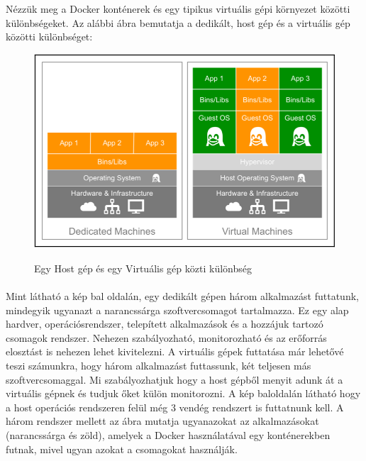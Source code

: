 \pagebreak

Nézzük meg a Docker konténerek és egy tipikus virtuális gépi környezet közötti különbségeket.
Az alábbi ábra bemutatja a dedikált, host gép és a virtuális gép közötti különbséget:

\begin{figure}[h]
	\centering
	\includegraphics[width=1\linewidth]{figures/host-machine-vs-vm}
	\caption{Egy Host gép és egy Virtuális gép közti különbség}
	\label{fig:hostvsvm}
	\cite{gallagher2015mastering}
\end{figure}

\paragraph{}
Mint látható a kép bal oldalán, egy dedikált gépen három alkalmazást futtatunk, mindegyik ugyanazt a narancssárga szoftvercsomagot tartalmazza. 
Ez egy alap hardver, operációsrendszer, telepített alkalmazások és a hozzájuk tartozó csomagok rendszer.
Nehezen szabályozható, monitorozható és az erőforrás elosztást is nehezen lehet kivitelezni.
A virtuális gépek futtatása már lehetővé teszi számunkra, hogy három alkalmazást futtassunk, két teljesen más szoftvercsomaggal.
Mi szabályozhatjuk hogy a host gépből menyit adunk át a virtuális gépnek és tudjuk őket külön monitorozni.
A kép baloldalán látható hogy a host operációs rendszeren felül még 3 vendég rendszert is futtatnunk kell.
A három rendszer mellett az ábra mutatja ugyanazokat az alkalmazásokat (narancssárga és zöld), amelyek a Docker használatával egy konténerekben futnak, mivel ugyan azokat a csomagokat használják.

\pagebreak

